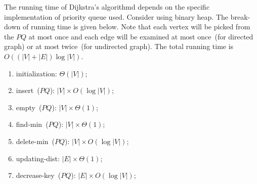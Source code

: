 \begin{minipage}{0.8\textwidth}
	\xxx
	\xxx
	\xxx
	\xxx
	\xxx
	\xxx
	\xxx
	\xxx
	\xxx
	\xxx
	\xxx
	\xxx
	\xxx
	\xxx
	\xxx
	\xxx
	\xxx
\end{minipage}


The running time of Dijkstra's algorithmd depends on the specific implementation of priority queue used.
Consider using binary heap. The break-down of running time is given below.
Note that each vertex will be picked from the $PQ$ at most once and each edge will be examined at most once~(for directed graph) or at most twice~(for undirected graph).
The total running time is $O((|V|+|E|)\log |V|)$.
\vspace*{-\topsep}
\begin{enumerate}
\item initialization: $\Theta(|V|)$;
\item insert~($PQ$): $|V| \times O(\log |V|)$;
\item empty~($PQ$): $|V| \times \Theta(1)$;
\item find-min~($PQ$): $|V| \times \Theta(1)$;
\item delete-min~($PQ$): $|V| \times O(\log |V|)$;
\item updating-dist: $|E| \times \Theta(1)$;
\item decrease-key~($PQ$): $|E| \times O(\log |V|)$;
\end{enumerate}


